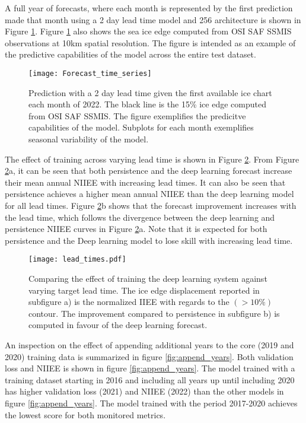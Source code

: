 \documentclass[../main/thesis]{subfiles}
\begin{document}
A full year of forecasts, where each month is represented by the first prediction made that month using a 2 day lead time model and 256 architecture is shown in Figure \ref{fig:timeseries}. Figure \ref{fig:timeseries} also shows the sea ice edge computed from OSI SAF SSMIS observations at 10km spatial resolution. The figure is intended as an example of the predictive capabilities of the model across the entire test dataset. 

\begin{figure}
    \centering
    \texttt{[image: Forecast\_time\_series]}
    \caption{\label{fig:timeseries}Prediction with a 2 day lead time given the first available ice chart each month of 2022. The black line is the 15\% ice edge computed from OSI SAF SSMIS. The figure exemplifies the predicitve capabilities of the model. Subplots for each month exemplifies seasonal variability of the model.}
\end{figure}

The effect of training across varying lead time is shown in Figure \ref{fig:lead_times}. From Figure \ref{fig:lead_times}a, it can be seen that both persistence and the deep learning forecast increase their mean annual NIIEE with increasing lead times. It can also be seen that persistence achieves a higher mean annual NIIEE than the deep learning model for all lead times. Figure \ref{fig:lead_times}b shows that the forecast improvement increases with the lead time, which follows the divergence between the deep learning and persistence NIIEE curves in Figure \ref{fig:lead_times}a. Note that it is expected for both persistence and the Deep learning model to lose skill with increasing lead time.

\begin{figure}
    \centering
    \texttt{[image: lead\_times.pdf]}
    \caption{\label{fig:lead_times}Comparing the effect of training the deep learning system against varying target lead time. The ice edge displacement reported in subfigure a) is the normalized IIEE with regards to the $(> 10\%)$ contour. The improvement compared to persistence in subfigure b) is computed in favour of the deep learning forecast.}
\end{figure}

An inspection on the effect of appending additional years to the core (2019 and 2020) training data is summarized in figure \ref{fig:append_years}. Both validation loss and NIIEE is shown in figure \ref{fig:append_years}. The model trained with a training dataset starting in 2016 and including all years up until including 2020 has higher validation loss (2021) and NIIEE (2022) than the other models in figure \ref{fig:append_years}. The model trained with the period 2017-2020 achieves the lowest score for both monitored metrics.
\end{document}
